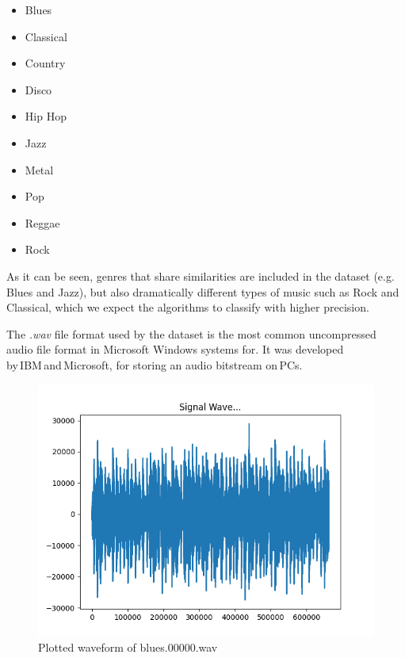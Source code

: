 \documentclass[12pt]{article}
\begin{document}
	\begin{itemize}
		\item Blues 
		\item Classical 
		\item Country 
		\item Disco 
		\item Hip Hop 	
		\item Jazz 
		\item Metal 
		\item Pop 
		\item Reggae 
		\item Rock 
	\end{itemize}

	As it can be seen, genres that share similarities are included in the dataset (e.g. Blues and Jazz), but also dramatically different types of music such as Rock and Classical, which we expect the algorithms to classify with higher precision.
	
	The \textit{.wav} file format used by the dataset is the most common uncompressed audio file format in Microsoft Windows systems for. It was developed by IBM and Microsoft, for storing an audio bitstream on PCs\cite{wave}.\\
	
	\begin{figure}[H]
		\hspace{100pt}\includegraphics[scale=0.7]{waveform}
		\caption{Plotted waveform of blues.00000.wav}
	\end{figure}
	
\end{document}
